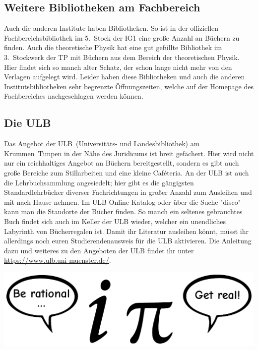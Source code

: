 \begin{multicols*}{2}
\subsection{Weitere Bibliotheken am Fachbereich}
Auch die anderen Institute haben Bibliotheken.
So ist in der offiziellen Fachbereichsbibliothek im 5.~Stock der IG1 eine große Anzahl an Büchern zu finden.
Auch die theoretische Physik hat eine gut gefüllte Bibliothek im 3.~Stockwerk der TP mit Büchern aus dem Bereich der theoretischen Physik.
Hier findet sich so manch alter Schatz, der schon lange nicht mehr von den Verlagen aufgelegt wird.
Leider haben diese Bibliotheken und auch die anderen Institutsbibliotheken sehr begrenzte Öffnungszeiten, welche auf der Homepage des Fachbereiches nachgeschlagen werden können.


\subsection{Die ULB}
Das Angebot der ULB~(Universitäts- und Landesbibliothek) am Krummen~Timpen in der Nähe des Juridicums ist breit gefächert.
Hier wird nicht nur ein reichhaltiges Angebot an Büchern bereitgestellt, sondern es gibt auch große Bereiche zum Stillarbeiten und eine kleine Caféteria.
An der ULB ist auch die Lehrbuchsammlung angesiedelt; hier gibt es die gängigsten Standardlehrbücher diverser Fachrichtungen in großer Anzahl zum Ausleihen und mit nach Hause nehmen.
Im ULB-Online-Katalog oder über die Suche "disco" kann man die Standorte der Bücher finden.
So manch ein seltenes gebrauchtes Buch findet sich auch im Keller der ULB wieder, welcher ein unendliches Labyrinth von Bücherregalen ist.
Damit ihr Literatur ausleihen könnt, müsst ihr allerdings noch euren Studierendenausweis für die ULB aktivieren. Die Anleitung dazu und weiteres zu den Angeboten der ULB findet ihr unter \url{https://www.ulb.uni-muenster.de/}.


\begin{center}
	\includegraphics[width=.8\columnwidth]{res/comics/be_rational_get_real_wide.pdf}
\end{center}

\end{multicols*}
